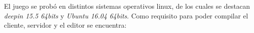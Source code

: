 El juego se probó en distintos sistemas operativos linux, de los cuales se destacan \emph{deepin 15.5 64bits} y \emph{Ubuntu 16.04 64bits}. Como requisito para poder compilar el cliente, servidor y el editor se encuentra:


